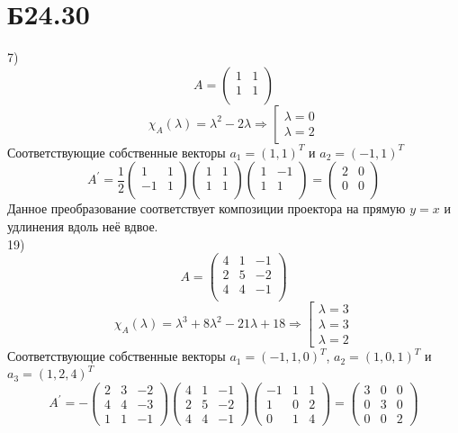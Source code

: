 \documentclass[a4paper,12pt]{article} %
\begin{document}
\section*{Б24.30}
7)$$A=\begin{pmatrix*}
    1&1\\
    1&1\\
\end{pmatrix*}$$
$$\chi_A(\lambda)=\lambda^2-2\lambda\Rightarrow\left[\begin{matrix}
    \lambda=0\\
    \lambda=2
\end{matrix}\right.$$
Соответствующие собственные векторы $a_1=(1,1)^{T}$ и $a_2=(-1,1)^{T}$
$$A^{\prime}=\frac{1}{2}\begin{pmatrix*}
    1&1\\
    -1&1\\
\end{pmatrix*}\begin{pmatrix*}
    1&1\\
    1&1\\
\end{pmatrix*}\begin{pmatrix*}
    1&-1\\
    1&1\\
\end{pmatrix*}=\begin{pmatrix*}
    2&0\\
    0&0\\
\end{pmatrix*}$$
Данное преобразование соответствует композиции проектора на прямую $y=x$ и удлинения вдоль неё вдвое.\\
19)$$A=\begin{pmatrix*}
    4&1&-1\\
    2&5&-2\\
    4&4&-1\\
\end{pmatrix*}$$
$$\chi_A(\lambda)=\lambda^3+8\lambda^2-21\lambda+18\Rightarrow\left[\begin{matrix}
    \lambda=3\\
    \lambda=3\\
    \lambda=2
\end{matrix}\right.$$
Соответствующие собственные векторы $a_1=(-1,1,0)^{T}$, $a_2=(1,0,1)^{T}$ и $a_3=(1,2,4)^{T}$
$$A^{\prime}=-\begin{pmatrix*}
    2&3&-2\\
    4&4&-3\\
    1&1&-1
\end{pmatrix*}\begin{pmatrix*}
    4&1&-1\\
    2&5&-2\\
    4&4&-1
\end{pmatrix*}\begin{pmatrix*}
    -1&1&1\\
    1&0&2\\
    0&1&4
\end{pmatrix*}=\begin{pmatrix*}
    3&0&0\\
    0&3&0\\
    0&0&2
\end{pmatrix*}$$
\end{document}
